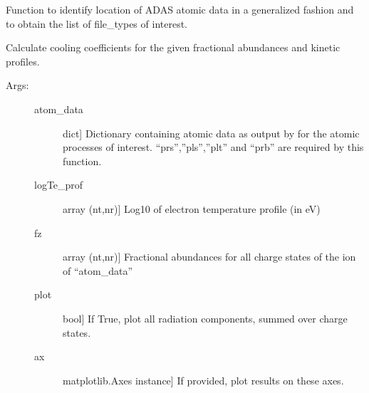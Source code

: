 \documentclass[letterpaper,10pt,english]{sphinxmanual}
\begin{document}

\begin{fulllineitems}
\label{\detokenize{aurora:aurora.atomic.get_atomdat_info}}
Function to identify location of ADAS atomic data in a generalized fashion
and to obtain the list of file\_types of interest.

\end{fulllineitems}


\begin{fulllineitems}
\label{\detokenize{aurora:aurora.atomic.get_cooling_factors}}
Calculate cooling coefficients for the given fractional abundances and kinetic profiles.
\begin{description}
\item[{Args:}] \leavevmode\begin{description}
\item[{atom\_data}] \leavevmode{[}dict{]}
Dictionary containing atomic data as output by {\hyperref[\detokenize{aurora:aurora.atomic.get_atom_data}]{}}
for the atomic processes of interest. “prs”,”pls”,”plt” and “prb” are required by this function.

\item[{logTe\_prof}] \leavevmode{[}array (nt,nr){]}
Log\sphinxhyphen{}10 of electron temperature profile (in eV)

\item[{fz}] \leavevmode{[}array (nt,nr){]}
Fractional abundances for all charge states of the ion of “atom\_data”

\item[{plot}] \leavevmode{[}bool{]}
If True, plot all radiation components, summed over charge states.

\item[{ax}] \leavevmode{[}matplotlib.Axes instance{]}
If provided, plot results on these axes.


\end{description}
\end{description}
\end{fulllineitems}
\end{document}
